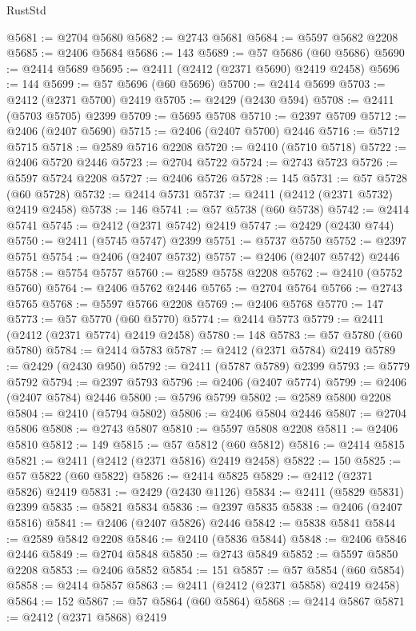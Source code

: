 \begin{lexlean}{RustStd}
\begin{coremodule}
@5681 := @2704 @5680
@5682 := @2743 @5681
@5684 := @5597 @5682 @2208
@5685 := @2406 @5684
@5686 := 143
@5689 := @57 @5686 (@60 @5686)
@5690 := @2414 @5689
@5695 := @2411 (@2412 (@2371 @5690) @2419 @2458)
@5696 := 144
@5699 := @57 @5696 (@60 @5696)
@5700 := @2414 @5699
@5703 := @2412 (@2371 @5700) @2419
@5705 := @2429 (@2430 @594)
@5708 := @2411 (@5703 @5705) @2399
@5709 := @5695 @5708
@5710 := @2397 @5709
@5712 := @2406 (@2407 @5690)
@5715 := @2406 (@2407 @5700) @2446
@5716 := @5712 @5715
@5718 := @2589 @5716 @2208
@5720 := @2410 (@5710 @5718)
@5722 := @2406 @5720 @2446
@5723 := @2704 @5722
@5724 := @2743 @5723
@5726 := @5597 @5724 @2208
@5727 := @2406 @5726
@5728 := 145
@5731 := @57 @5728 (@60 @5728)
@5732 := @2414 @5731
@5737 := @2411 (@2412 (@2371 @5732) @2419 @2458)
@5738 := 146
@5741 := @57 @5738 (@60 @5738)
@5742 := @2414 @5741
@5745 := @2412 (@2371 @5742) @2419
@5747 := @2429 (@2430 @744)
@5750 := @2411 (@5745 @5747) @2399
@5751 := @5737 @5750
@5752 := @2397 @5751
@5754 := @2406 (@2407 @5732)
@5757 := @2406 (@2407 @5742) @2446
@5758 := @5754 @5757
@5760 := @2589 @5758 @2208
@5762 := @2410 (@5752 @5760)
@5764 := @2406 @5762 @2446
@5765 := @2704 @5764
@5766 := @2743 @5765
@5768 := @5597 @5766 @2208
@5769 := @2406 @5768
@5770 := 147
@5773 := @57 @5770 (@60 @5770)
@5774 := @2414 @5773
@5779 := @2411 (@2412 (@2371 @5774) @2419 @2458)
@5780 := 148
@5783 := @57 @5780 (@60 @5780)
@5784 := @2414 @5783
@5787 := @2412 (@2371 @5784) @2419
@5789 := @2429 (@2430 @950)
@5792 := @2411 (@5787 @5789) @2399
@5793 := @5779 @5792
@5794 := @2397 @5793
@5796 := @2406 (@2407 @5774)
@5799 := @2406 (@2407 @5784) @2446
@5800 := @5796 @5799
@5802 := @2589 @5800 @2208
@5804 := @2410 (@5794 @5802)
@5806 := @2406 @5804 @2446
@5807 := @2704 @5806
@5808 := @2743 @5807
@5810 := @5597 @5808 @2208
@5811 := @2406 @5810
@5812 := 149
@5815 := @57 @5812 (@60 @5812)
@5816 := @2414 @5815
@5821 := @2411 (@2412 (@2371 @5816) @2419 @2458)
@5822 := 150
@5825 := @57 @5822 (@60 @5822)
@5826 := @2414 @5825
@5829 := @2412 (@2371 @5826) @2419
@5831 := @2429 (@2430 @1126)
@5834 := @2411 (@5829 @5831) @2399
@5835 := @5821 @5834
@5836 := @2397 @5835
@5838 := @2406 (@2407 @5816)
@5841 := @2406 (@2407 @5826) @2446
@5842 := @5838 @5841
@5844 := @2589 @5842 @2208
@5846 := @2410 (@5836 @5844)
@5848 := @2406 @5846 @2446
@5849 := @2704 @5848
@5850 := @2743 @5849
@5852 := @5597 @5850 @2208
@5853 := @2406 @5852
@5854 := 151
@5857 := @57 @5854 (@60 @5854)
@5858 := @2414 @5857
@5863 := @2411 (@2412 (@2371 @5858) @2419 @2458)
@5864 := 152
@5867 := @57 @5864 (@60 @5864)
@5868 := @2414 @5867
@5871 := @2412 (@2371 @5868) @2419

\end{coremodule}
\end{lexlean}
